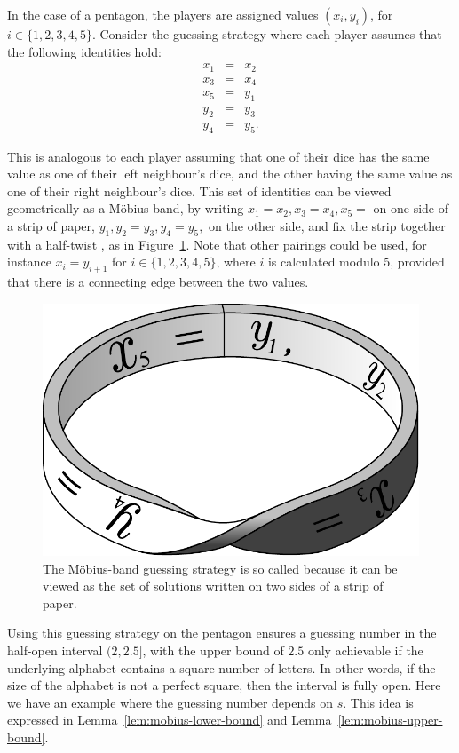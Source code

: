 In the case of a pentagon, the players are assigned values $(x_i, y_i)$, for $i \in \{1, 2, 3, 4, 5\}$. Consider the guessing strategy where each player assumes that the following identities hold:
\begin{eqnarray}
  	x_1 & = & x_2 \nonumber \\
  	x_3 & = & x_4 \nonumber \\
  	x_5 & = & y_1 \nonumber \\
  	y_2 & = & y_3 \nonumber \\
  	y_4 & = & y_5. \label{eqn:mobius}
\end{eqnarray}

\newpage

This is analogous to each player assuming that one of their dice has the same value as one of their left neighbour's dice, and the other having the same value as one of their right neighbour's dice. This set of identities can be viewed geometrically as a M{\"o}bius band, by writing $x_1 = x_2, x_3 = x_4, x_5 = $ on one side of a strip of paper, $y_1, y_2 = y_3, y_4 = y_5,$ on the other side, and fix the strip together with a half-twist \cite{riis2007}, as in Figure~\ref{fig:mobius-strategy}. Note that other pairings could be used, for instance $x_i = y_{i + 1}$ for $i \in \{1, 2, 3, 4, 5\}$, where $i$ is calculated modulo $5$, provided that there is a connecting edge between the two values.

\begin{figure}[ht]
	\centering
	\includegraphics[width=.5\textwidth]{figures/mobius_strategy.pdf}
	\caption[The M{\"o}bius-band guessing strategy]{The M{\"o}bius-band guessing strategy is so called because it can be viewed as the set of solutions written on two sides of a strip of paper.}
	\label{fig:mobius-strategy}
\end{figure}

Using this guessing strategy on the pentagon ensures a guessing number in the half-open interval $(2, 2.5]$, with the upper bound of $2.5$ only achievable if the underlying alphabet contains a square number of letters. In other words, if the size of the alphabet is not a perfect square, then the interval is fully open. Here we have an example where the guessing number depends on $s$. This idea is expressed in Lemma~\ref{lem:mobius-lower-bound} and Lemma~\ref{lem:mobius-upper-bound}.

